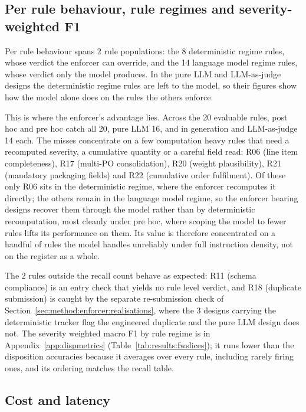 \subsection{Per rule behaviour, rule regimes and severity-weighted F1}
\label{sec:results:regimes}

Per rule behaviour spans 2 rule populations: the 8 deterministic regime rules, whose verdict the enforcer can override, and the 14 language model regime rules, whose verdict only the model produces. In the pure LLM and LLM-as-judge designs the deterministic regime rules are left to the model, so their figures show how the model alone does on the rules the others enforce.

This is where the enforcer's advantage lies. Across the 20 evaluable rules, post hoc and pre hoc catch all 20, pure LLM 16, and in generation and LLM-as-judge 14 each. The misses concentrate on a few computation heavy rules that need a recomputed severity, a cumulative quantity or a careful field read: R06 (line item completeness), R17 (multi-PO consolidation), R20 (weight plausibility), R21 (mandatory packaging fields) and R22 (cumulative order fulfilment). Of these only R06 sits in the deterministic regime, where the enforcer recomputes it directly; the others remain in the language model regime, so the enforcer bearing designs recover them through the model rather than by deterministic recomputation, most cleanly under pre hoc, where scoping the model to fewer rules lifts its performance on them. Its value is therefore concentrated on a handful of rules the model handles unreliably under full instruction density, not on the register as a whole.

The 2 rules outside the recall count behave as expected: R11 (schema compliance) is an entry check that yields no rule level verdict, and R18 (duplicate submission) is caught by the separate re-submission check of Section~\ref{sec:method:enforcer:realisations}, where the 3 designs carrying the deterministic tracker flag the engineered duplicate and the pure LLM design does not. The severity weighted macro F1 by rule regime is in Appendix~\ref{app:dispmetrics} (Table~\ref{tab:results:fwslices}); it runs lower than the disposition accuracies because it averages over every rule, including rarely firing ones, and its ordering matches the recall table.


\subsection{Cost and latency}
\label{sec:results:cost}

